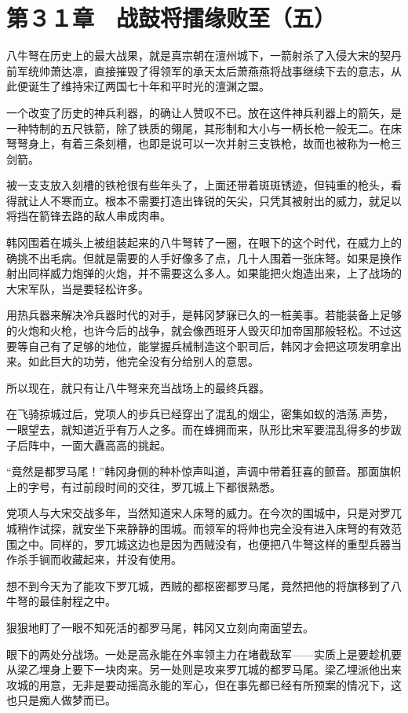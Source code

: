 \section{第３１章　战鼓将擂缘败至（五） }

八牛弩在历史上的最大战果，就是真宗朝在澶州城下，一箭射杀了入侵大宋的契丹前军统帅萧达凛，直接摧毁了得领军的承天太后萧燕燕将战事继续下去的意志，从此便诞生了维持宋辽两国七十年和平时光的澶渊之盟。

一个改变了历史的神兵利器，的确让人赞叹不已。放在这件神兵利器上的箭矢，是一种特制的五尺铁箭，除了铁质的翎尾，其形制和大小与一柄长枪一般无二。在床弩弩身上，有着三条刻槽，也即是说可以一次并射三支铁枪，故而也被称为一枪三剑箭。

被一支支放入刻槽的铁枪很有些年头了，上面还带着斑斑锈迹，但钝重的枪头，看得就让人不寒而立。根本不需要打造出锋锐的矢尖，只凭其被射出的威力，就足以将挡在箭锋去路的敌人串成肉串。

韩冈围着在城头上被组装起来的八牛弩转了一圈，在眼下的这个时代，在威力上的确挑不出毛病。但就是需要的人手好像多了点，几十人围着一张床弩。如果是换作射出同样威力炮弹的火炮，并不需要这么多人。如果能把火炮造出来，上了战场的大宋军队，当是要轻松许多。

用热兵器来解决冷兵器时代的对手，是韩冈梦寐已久的一桩美事。若能装备上足够的火炮和火枪，也许今后的战争，就会像西班牙人毁灭印加帝国那般轻松。不过这要等自己有了足够的地位，能掌握兵械制造这个职司后，韩冈才会把这项发明拿出来。如此巨大的功劳，他完全没有分给别人的意思。

所以现在，就只有让八牛弩来充当战场上的最终兵器。

在飞骑掠城过后，党项人的步兵已经穿出了混乱的烟尘，密集如蚁的浩荡.声势，一眼望去，就知道近乎有万人之多。而在蜂拥而来，队形比宋军要混乱得多的步跋子后阵中，一面大纛高高的挑起。

“竟然是都罗马尾！”韩冈身侧的种朴惊声叫道，声调中带着狂喜的颤音。那面旗帜上的字号，有过前段时间的交往，罗兀城上下都很熟悉。

党项人与大宋交战多年，当然知道宋人床弩的威力。在今次的围城中，只是对罗兀城稍作试探，就安坐下来静静的围城。而领军的将帅也完全没有进入床弩的有效范围之中。同样的，罗兀城这边也是因为西贼没有，也便把八牛弩这样的重型兵器当作杀手锏而收藏起来，并没有使用。

想不到今天为了能攻下罗兀城，西贼的都枢密都罗马尾，竟然把他的将旗移到了八牛弩的最佳射程之中。

狠狠地盯了一眼不知死活的都罗马尾，韩冈又立刻向南面望去。

眼下的两处分战场。一处是高永能在外率领主力在堵截敌军——实质上是要趁机要从梁乙埋身上要下一块肉来。另一处则是攻来罗兀城的都罗马尾。梁乙埋派他出来攻城的用意，无非是要动摇高永能的军心，但在事先都已经有所预案的情况下，这也只是痴人做梦而已。

